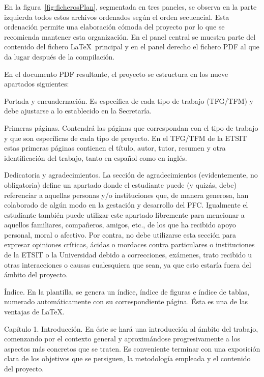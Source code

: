 En la figura~\ref{fig:ficherosPlan}, segmentada en tres paneles, se observa en la parte izquierda todos estos archivos ordenados según el orden secuencial. Esta ordenación permite una elaboración cómoda del proyecto por lo que se recomienda mantener esta organización. En el panel central se muestra parte del contenido del fichero \LaTeX\ principal y en el panel derecho el fichero PDF al que da lugar después de la compilación.

En el documento PDF resultante, el proyecto se estructura en los nueve apartados siguientes:
\begin{descript}
	\item[Portada y encuadernación.] Es específica de cada tipo de trabajo (TFG/TFM) y debe ajustarse a lo establecido en la Secretaría.

	\item[Primeras páginas.] Contendrá las páginas que correspondan con el tipo de trabajo y que son específicas de cada tipo de proyecto. En el TFG/TFM de la ETSIT estas primeras páginas contienen el título, autor, tutor, resumen y otra identificación del trabajo, tanto en español como en inglés.

	\item[Dedicatoria y agradecimientos.] La sección de agradecimientos (evidentemente, no obligatoria) define un apartado donde el estudiante puede (y quizás, debe) referenciar a aquellas personas y/o instituciones que, de manera generosa, han colaborado de algún modo en la gestación y desarrollo del PFC. Igualmente el estudiante también puede utilizar este apartado libremente para mencionar a aquellos familiares, compañeros, amigos, etc., de los que ha recibido apoyo personal, moral o afectivo. Por contra, no debe utilizarse esta sección para expresar opiniones críticas, ácidas o mordaces contra particulares o instituciones de la ETSIT o la Universidad debido a correcciones, exámenes, trato recibido u otras interacciones o causas cualesquiera que sean, ya que esto estaría fuera del ámbito del proyecto.


	\item[Índice.] En la plantilla, se genera un índice, índice de figuras e índice de tablas, numerado automáticamente con su correspondiente página. Ésta es una de las ventajas de \LaTeX.

	\item[Capítulo 1. Introducción.] En éste se hará una introducción al ámbito del trabajo, comenzando por el contexto general y aproximándose progresivamente a los aspectos más concretos que se traten.	Es conveniente terminar con una exposición clara de los objetivos que se persiguen, la metodología empleada y el contenido del proyecto.


\end{descript}
